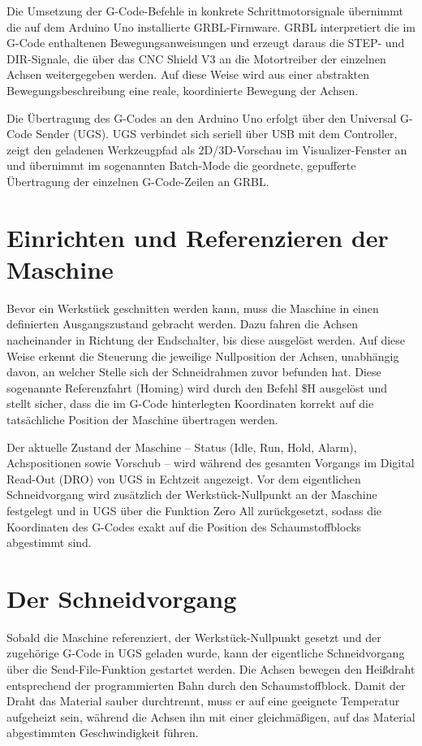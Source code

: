 Die Umsetzung der G-Code-Befehle in konkrete Schrittmotorsignale
übernimmt die auf dem Arduino Uno installierte GRBL-Firmware. GRBL
interpretiert die im G-Code enthaltenen Bewegungsanweisungen und erzeugt
daraus die STEP- und DIR-Signale, die über das CNC Shield V3 an die
Motortreiber der einzelnen Achsen weitergegeben werden. Auf diese Weise
wird aus einer abstrakten Bewegungsbeschreibung eine reale, koordinierte
Bewegung der Achsen.

Die Übertragung des G-Codes an den Arduino Uno erfolgt über den
Universal G-Code Sender (UGS). UGS verbindet sich seriell über USB mit
dem Controller, zeigt den geladenen Werkzeugpfad als 2D/3D-Vorschau im
Visualizer-Fenster an und übernimmt im sogenannten Batch-Mode die
geordnete, gepufferte Übertragung der einzelnen G-Code-Zeilen an GRBL.

\section{Einrichten und Referenzieren der Maschine}

Bevor ein Werkstück geschnitten werden kann, muss die Maschine in einen
definierten Ausgangszustand gebracht werden. Dazu fahren die Achsen
nacheinander in Richtung der Endschalter, bis diese ausgelöst werden.
Auf diese Weise erkennt die Steuerung die jeweilige Nullposition der
Achsen, unabhängig davon, an welcher Stelle sich der Schneidrahmen zuvor
befunden hat. Diese sogenannte Referenzfahrt (Homing) wird durch den
Befehl \$H ausgelöst und stellt sicher, dass die im G-Code hinterlegten
Koordinaten korrekt auf die tatsächliche Position der Maschine
übertragen werden.

Der aktuelle Zustand der Maschine -- Status (Idle, Run, Hold, Alarm),
Achspositionen sowie Vorschub -- wird während des gesamten Vorgangs im
Digital Read-Out (DRO) von UGS in Echtzeit angezeigt. Vor dem
eigentlichen Schneidvorgang wird zusätzlich der Werkstück-Nullpunkt an
der Maschine festgelegt und in UGS über die Funktion Zero All
zurückgesetzt, sodass die Koordinaten des G-Codes exakt auf die Position
des Schaumstoffblocks abgestimmt sind.

\section{Der Schneidvorgang}

Sobald die Maschine referenziert, der Werkstück-Nullpunkt gesetzt und
der zugehörige G-Code in UGS geladen wurde, kann der eigentliche
Schneidvorgang über die Send-File-Funktion gestartet werden. Die Achsen
bewegen den Heißdraht entsprechend der programmierten Bahn durch den
Schaumstoffblock. Damit der Draht das Material sauber durchtrennt, muss
er auf eine geeignete Temperatur aufgeheizt sein, während die Achsen ihn
mit einer gleichmäßigen, auf das Material abgestimmten Geschwindigkeit
führen.


